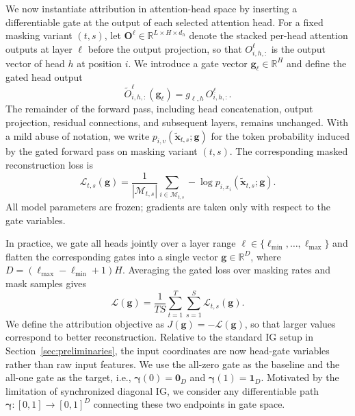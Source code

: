 We now instantiate attribution in attention-head space by inserting a differentiable gate at the output of each selected attention head. For a fixed masking variant $(t,s)$, let $\mathbf{O}^\ell\in\mathbb{R}^{L\times H\times d_h}$ denote the stacked per-head attention outputs at layer $\ell$ before the output projection, so that $O^\ell_{i,h,:}$ is the output vector of head $h$ at position $i$. We introduce a gate vector $\mathbf{g}_\ell\in\mathbb{R}^{H}$ and define the gated head output
\begin{equation}
    \tilde{O}_{i,h,:}^\ell(\mathbf{g}_\ell)
    =
    g_{\ell,h}\,O_{i,h,:}^\ell.
    \label{eq:gate_def}
\end{equation}
The remainder of the forward pass, including head concatenation, output projection, residual connections, and subsequent layers, remains unchanged. With a mild abuse of notation, we write $p_{i,v}(\tilde{\mathbf{x}}_{t,s};\mathbf{g})$ for the token probability induced by the gated forward pass on masking variant $(t,s)$. The corresponding masked reconstruction loss is
\begin{equation}
    \mathcal{L}_{t,s}(\mathbf{g})
    =
    \frac{1}{|\mathcal{M}_{t,s}|}
    \sum_{i\in\mathcal{M}_{t,s}} -\log p_{i,x_i}(\tilde{\mathbf{x}}_{t,s};\mathbf{g}).
\end{equation}
All model parameters are frozen; gradients are taken only with respect to the gate variables.

In practice, we gate all heads jointly over a layer range $\ell\in\{\ell_{\min},\dots,\ell_{\max}\}$ and flatten the corresponding gates into a single vector $\mathbf{g}\in\mathbb{R}^{D}$, where $D=(\ell_{\max}-\ell_{\min}+1)H$. Averaging the gated loss over masking rates and mask samples gives
\begin{equation}
    \mathcal{L}(\mathbf{g})
    =
    \frac{1}{TS}\sum_{t=1}^{T}\sum_{s=1}^{S}\mathcal{L}_{t,s}(\mathbf{g}).
\end{equation}
We define the attribution objective as $J(\mathbf{g})=-\mathcal{L}(\mathbf{g})$, so that larger values correspond to better reconstruction. Relative to the standard IG setup in Section~\ref{sec:preliminaries}, the input coordinates are now head-gate variables rather than raw input features. We use the all-zero gate as the baseline and the all-one gate as the target, i.e., $\boldsymbol{\gamma}(0)=\mathbf{0}_{D}$ and $\boldsymbol{\gamma}(1)=\mathbf{1}_{D}$. Motivated by the limitation of synchronized diagonal IG, we consider any differentiable path $\boldsymbol{\gamma}:[0,1]\to[0,1]^D$ connecting these two endpoints in gate space.

